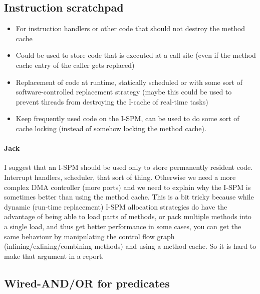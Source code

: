 \documentclass{IEEEtran}
\newcommand{\comment}[3]{\paragraph*{\textbf{#1}}{\color{#3}#2}}
\newcommand{\jack}[1]{\comment{Jack}{#1}{Magenta}}
\begin{document}
\subsection{Instruction scratchpad}

\begin{itemize}
\item For instruction handlers or other code that should not destroy the method cache
\item Could be used to store code that is executed at a call site (even if the method cache entry of the caller gets replaced)
\item Replacement of code at runtime, statically scheduled or with some sort of software-controlled replacement strategy (maybe this could
be used to prevent threads from destroying the I-cache of real-time tasks)
\item Keep frequently used code on the I-SPM, can be used to do some sort of cache locking (instead of somehow locking the method cache).
\end{itemize}

\jack{I suggest that an I-SPM should be used only to store
permanently resident code. Interrupt handlers, scheduler,
that sort of thing.  Otherwise we need a more complex DMA
controller (more ports) and we need to explain why the I-SPM is
sometimes better than using the method cache. This is a bit tricky
because while dynamic (run-time replacement) I-SPM allocation strategies
do have the advantage of being able to load parts of methods, or pack
multiple methods into a single load, and thus get better performance
in some cases, you can get the same behaviour by manipulating the
control flow graph (inlining/exlining/combining methods) and using
a method cache. So it is hard to make that argument in a report.}


\subsection{Wired-AND/OR for predicates}
\end{document}
